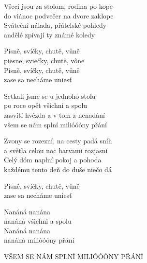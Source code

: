 
\ve{}
Všeci jsou za stolom, rodina po kope\\
do viánoc podvečer na dvore zaklope\\
Sváteční nálada, přátelské pohledy\\
andělé zpívají ty známé koledy

\ve{}
Písně, svíčky, chutě, vůně\\
piesne, sviečky, chutě, vône\\
Písně, svíčky, chutě, vůně\\
zase sa necháme uniesť

\cho{}
Setkali jsme se u jednoho stolu\\
po roce opět všichni a spolu\\
zasvítí hvězda a v tom z nenadání\\
všem se nám splní milióóóny přání

\cho{}

\ve{}
Zvony se rozezní, na cesty padá sníh\\
a světla celou noc barvami rozjasní\\
Celý dóm naplní pokoj a pohoda\\
každému tento deň do duše niečo dá

\ve{}
Písně, svíčky, chutě, vůně\\
zase sa necháme uniesť

\cho{}

\cho{}

Nanáná nanána\\
nanáná všichni a spolu\\
Nanáná nanána\\
nanáná milióóóny přání

\cho{}

\re{}
VŠEM SE NÁM SPLNÍ MILIÓÓÓNY PŘÁNÍ

\esong{}
